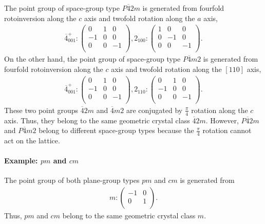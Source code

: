 The point group of space-group type $P\overline{4}2m$ is generated from fourfold rotoinversion along the $c$ axis and twofold rotation along the $a$ axis,
\begin{align*}
  \overline{4}^{+}_{001}:
    \begin{pmatrix}
      0 & 1 & 0 \\
      -1 & 0 & 0 \\
      0 & 0 & -1 \\
    \end{pmatrix},
  2_{100}:
    \begin{pmatrix}
      1 & 0 & 0 \\
      0 & -1 & 0 \\
      0 & 0 & -1 \\
    \end{pmatrix}.
\end{align*}
On the other hand, the point group of space-group type $P\overline{4}m2$ is generated from fourfold rotoinversion along the $c$ axis and twofold rotation along the $[110]$ axis,
\begin{align*}
  \overline{4}^{+}_{001}:
    \begin{pmatrix}
      0 & 1 & 0 \\
      -1 & 0 & 0 \\
      0 & 0 & -1 \\
    \end{pmatrix},
  2_{110}:
    \begin{pmatrix}
      0 & 1 & 0 \\
      -1 & 0 & 0 \\
      0 & 0 & -1 \\
    \end{pmatrix}.
\end{align*}
These two point groups $\overline{4}2m$ and $\overline{4}m2$ are conjugated by $\frac{\pi}{4}$ rotation along the $c$ axis.
Thus, they belong to the same geometric crystal class $\overline{4}2m$.
However, $P\overline{4}2m$ and $P\overline{4}m2$ belong to different space-group types because the $\frac{\pi}{4}$ rotation cannot act on the lattice.

\paragraph{Example: $pm$ and $cm$}

The point group of both plane-group types $pm$ and $cm$ is generated from
\begin{align}
  m:
    \begin{pmatrix}
      -1 & 0 \\
      0 & 1 \\
    \end{pmatrix}.
\end{align}
Thus, $pm$ and $cm$ belong to the same geometric crystal class $m$.

